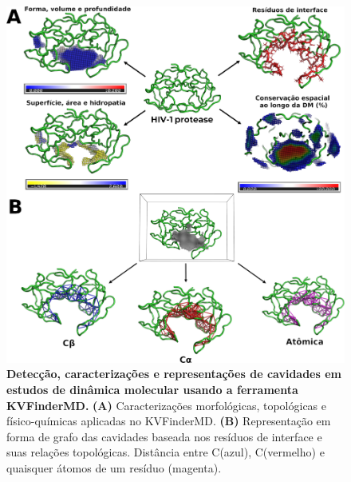 \documentclass[Portugues]{phdquali}
\begin{document}
\begin{figure}[h]
  \centering
  \includegraphics[scale=0.8]{images/kvmd-overview.png}
  \caption[Detecção, caracterizações e representações de cavidades em estudos de dinâmica molecular usando a ferramenta KVFinderMD]{\textbf{Detecção, caracterizações e representações de cavidades em estudos de dinâmica molecular usando a ferramenta KVFinderMD.} \textbf{(A)} Caracterizações morfológicas, topológicas e físico-químicas aplicadas no KVFinderMD. \textbf{(B)} Representação em forma de grafo das cavidades baseada nos resíduos de interface e suas relações topológicas. Distância entre C\textbeta (azul), C\textalpha (vermelho) e quaisquer átomos de um resíduo (magenta).}
  \label{fig:kvmd-overview}
\end{figure}
\end{document}
